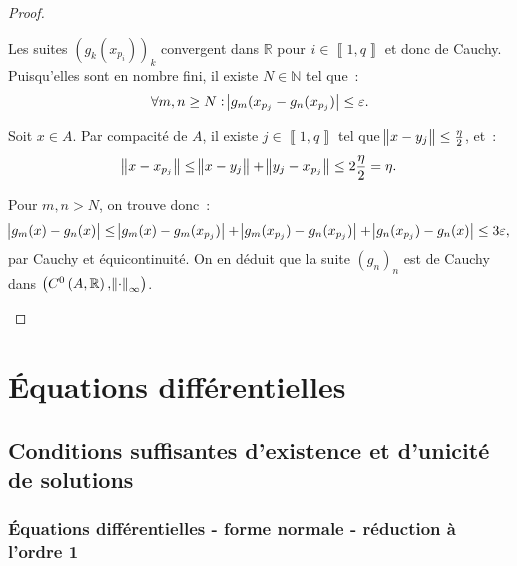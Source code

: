 \documentclass{report}
\theoremstyle{definition}
\theoremstyle{remark}
\numberwithin{equation}{section}
\newcommand{\R}{\mathbb R}
\newcommand{\N}{\mathbb N}
\newcommand{\intint}[2]{\left\llbracket#1, #2\right\rrbracket}
\newcommand{\evfn}[3]{\left(#1\left(#2, #3\right), \norm {\cdot}_{\infty}\right)}
\newcommand{\evnC}[3]{{\evfn {C^{#1}}{#2}{#3}}}
\begin{document}
\begin{proof}
\begin{itemize}
				Les suites $(g_k(x_{p_i}))_k$ convergent dans $\R$ pour $i \in \intint 1q$ et donc de Cauchy. Puisqu'elles sont en nombre fini, il existe
				$N \in \N$ tel que~:
				\begin{equation}
					\forall m, n \geq N : \abs {g_m(x_{p_j}-g_n(x_{p_j})} \leq \varepsilon.
				\end{equation}

				Soit $x \in A$. Par compacité de $A$, il existe $j \in \intint 1q$ tel que $\norm {x-y_j} \leq \frac \eta2$, et~:
				\begin{equation}
					\norm {x-x_{p_j}} \leq \norm {x - y_j} + \norm {y_j - x_{p_j}} \leq 2\frac \eta2 = \eta.
				\end{equation}

				Pour $m, n > N$, on trouve donc~:
				\begin{equation}
					\abs {g_m(x)-g_n(x)} \leq \abs {g_m(x) - g_m(x_{p_j})} + \abs {g_m(x_{p_j}) - g_n(x_{p_j})} + \abs {g_n(x_{p_j}) - g_n(x)} \leq 3\varepsilon,
				\end{equation}
				par Cauchy et équicontinuité. On en déduit que la suite $(g_n)_n$ est de Cauchy dans $\evnC0A\R$.
			\end{itemize}
			\end{proof}

\part{Équations différentielles}
\chapter{Conditions suffisantes d'existence et d'unicité de solutions}
	\section{Équations différentielles - forme normale - réduction à l'ordre 1}
\end{document}
